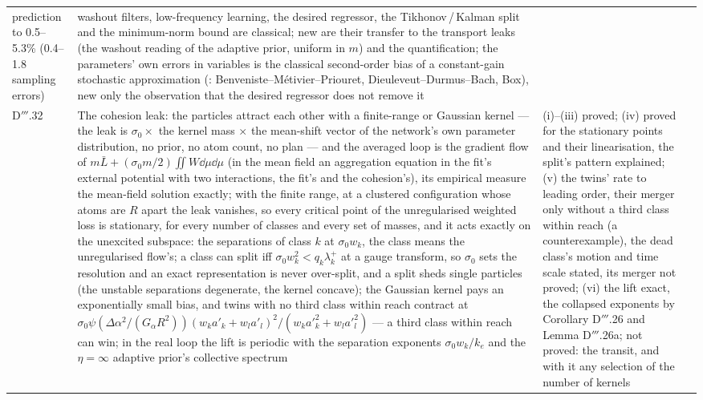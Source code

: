 {\begin{longtable}{@{}>{\raggedright\arraybackslash}p{}>{\raggedright\arraybackslash}p{}%
>{\raggedright\arraybackslash}p{}>{\raggedright\arraybackslash}p{}@{}}
prediction to 0.5--5.3\% (0.4--1.8 sampling errors)
& washout filters, low-frequency learning, the desired regressor, the Tikhonov\,/\,Kalman split and the minimum-norm
bound are classical; new are their transfer to the transport leaks (the washout reading of the adaptive prior,
uniform in $m$) and the quantification; the parameters' own errors in variables is the classical second-order bias of
a constant-gain stochastic approximation (\cite{S57}: Benveniste--M\'etivier--Priouret, Dieuleveut--Durmus--Bach,
Box), new only the observation that the desired regressor does not remove it\\
\addlinespace[0.5pt]
D$'''$.32 & The cohesion leak: the particles attract each other with a finite-range or Gaussian kernel --- the leak
is $\sigma_0\times$ the kernel mass $\times$ the mean-shift vector of the network's own parameter distribution, no
prior, no atom count, no plan --- and the averaged loop is the gradient flow of
$m\bar L + (\sigma_0m/2)\iint W\dd\mu\dd\mu$ (in the mean field an aggregation equation in the fit's external
potential with two interactions, the fit's and the cohesion's), its empirical measure the mean-field solution exactly;
with the finite range, at a clustered configuration whose atoms are $R$ apart the leak vanishes, so every critical
point of the unregularised weighted loss is stationary, for every number of classes and every set of masses, and it
acts exactly on the unexcited subspace: the separations of class $k$ at $\sigma_0w_k$, the class means the
unregularised flow's; a class can split iff $\sigma_0w_k^2 < q_k\lambda^+_k$ at a gauge transform, so $\sigma_0$ sets
the resolution and an exact representation is never over-split, and a split sheds single particles (the unstable
separations degenerate, the kernel concave); the Gaussian kernel pays an exponentially small bias, and twins with no
third class within reach contract at
$\sigma_0\psi(\Delta\alpha^2/(G_\alpha R^2))(w_ka'_k + w_la'_l)^2/(w_ka'^2_k + w_la'^2_l)$ --- a third class within
reach can win; in the real loop the lift is periodic with the separation exponents $\sigma_0w_k/k_e$ and the
$\eta = \infty$ adaptive prior's collective spectrum
& (i)--(iii) proved; (iv) proved for the stationary points and their linearisation, the split's pattern explained;
(v) the twins' rate to leading order, their merger only without a third class within reach (a counterexample), the
dead class's motion and time scale stated, its merger not proved; (vi) the lift exact, the collapsed exponents by
Corollary D$'''$.26 and Lemma D$'''$.26a; not proved: the transit, and with it any selection of the number of kernels

\end{longtable}}
